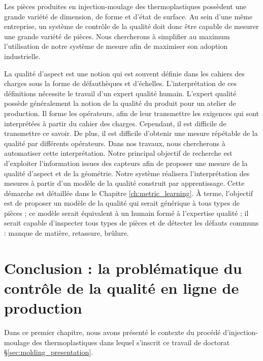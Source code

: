 Les pièces produites en injection-moulage des thermoplastiques possèdent une grande variété de dimension, de forme et d'état de surface.
Au sein d'une même entreprise, un système de contrôle de la qualité doit donc être capable de mesurer une grande variété de pièces.
Nous chercherons à simplifier au maximum l'utilisation de notre système de mesure afin de maximiser son adoption industrielle.   %

La qualité d'aspect est une notion qui est souvent définie dans les cahiers des charges sous la forme de défauthèques et d'échelles.
L'interprétation de ces définitions nécessite le travail d'un expert qualité humain.
L'expert qualité possède généralement la notion de la qualité du produit pour un atelier de production.
Il forme les opérateurs, afin de leur transmettre les exigences qui sont interprétées à partir du cahier des charges.
Cependant, il est difficile de transmettre ce savoir.
De plus, il est difficile d'obtenir une mesure répétable de la qualité par différents opérateurs.
Dans nos travaux, nous chercherons à automatiser cette interprétation.
Notre principal objectif de recherche est d'exploiter l'information issues des capteurs afin de proposer une mesure de la qualité d'aspect et de la géométrie.
Notre système réalisera l'interprétation des mesures à partir d'un modèle de la qualité construit par apprentissage.
Cette démarche est détaillée dans le Chapitre \ref{ch:metric_learning}.
À terme, l'objectif est de proposer un modèle de la qualité qui serait générique à tous types de pièces ;
ce modèle serait équivalent à un humain formé à l'expertise qualité ; il serait capable d'inspecter tous types de pièces et de détecter les défauts communs : manque de matière, retassure, brûlure.


\section{Conclusion : la problématique du contrôle de la qualité en ligne de production}
Dans ce premier chapitre, nous avons présenté le contexte du procédé d'injection-moulage des thermoplastiques dans lequel s’inscrit ce travail de doctorat §\ref{sec:molding_presentation}.

